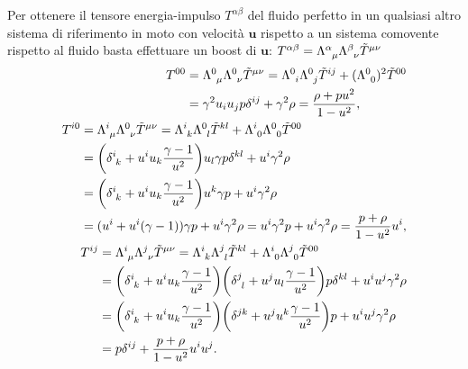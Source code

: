 Per ottenere il tensore energia-impulso $T^{\alpha\beta}$ del fluido perfetto in
un qualsiasi altro sistema di riferimento in moto con velocità $\bm{u}$ rispetto
a un sistema comovente rispetto al fluido basta effettuare un boost di
$\bm{u}$:
$T^{\alpha\beta} =
\tensor{\Lambda}{^{\alpha}_{\mu}}\tensor{\Lambda}{^{\beta}_{\nu}}\tilde
T^{\mu\nu}$
\begin{subequations}
  \begin{align}
    \begin{split}
      T^{00} &= \tensor{\Lambda}{^{0}_{\mu}} \tensor{\Lambda}{^{0}_{\nu}} \tilde
      T^{\mu\nu} = \tensor{\Lambda}{^{0}_{i}} \tensor{\Lambda}{^{0}_{j}} \tilde
      T^{ij} + (\tensor{\Lambda}{^{0}_{0}})^{2} \tilde T^{00} \\
      &= \gamma^{2} u_{i} u_{j} p \delta^{ij} + \gamma^{2} \rho = \frac{\rho +
        pu^{2}}{1-u^{2}},
    \end{split} \\
    \begin{split}
      T^{i0} &= \tensor{\Lambda}{^{i}_{\mu}} \tensor{\Lambda}{^{0}_{\nu}} \tilde
      T^{\mu\nu} = \tensor{\Lambda}{^{i}_{k}} \tensor{\Lambda}{^{0}_{l}} \tilde
      T^{kl} + \tensor{\Lambda}{^{i}_{0}} \tensor{\Lambda}{^{0}_{0}} \tilde
      T^{00} \\
      &= \bigg(\tensor{\delta}{^{i}_{k}} + u^{i}u_{k}\frac{\gamma -
        1}{u^{2}}\bigg) u_{l} \gamma p \delta^{kl} + u^{i} \gamma^{2} \rho \\
      &= \bigg(\tensor{\delta}{^{i}_{k}} + u^{i}u_{k}\frac{\gamma - 1}{u^{2}}\bigg)
      u^{k} \gamma p + u^{i} \gamma^{2} \rho \\
      &= (u^{i} + u^{i}(\gamma - 1)) \gamma p + u^{i} \gamma^{2} \rho =
      u^{i}\gamma^{2} p + u^{i} \gamma^{2} \rho = \frac{p + \rho}{1 -
        u^{2}}u^{i},
    \end{split} \\
    \begin{split}
      T^{ij} &= \tensor{\Lambda}{^{i}_{\mu}} \tensor{\Lambda}{^{j}_{\nu}} \tilde
      T^{\mu\nu} = \tensor{\Lambda}{^{i}_{k}} \tensor{\Lambda}{^{j}_{l}} \tilde
      T^{kl} + \tensor{\Lambda}{^{i}_{0}} \tensor{\Lambda}{^{j}_{0}} \tilde
      T^{00} \\
      &= \bigg(\tensor{\delta}{^{i}_{k}} + u^{i}u_{k}\frac{\gamma -
        1}{u^{2}}\bigg) \bigg(\tensor{\delta}{^{j}_{l}} + u^{j}u_{l}\frac{\gamma
        - 1}{u^{2}}\bigg) p \delta^{kl} + u^{i}u^{j} \gamma^{2} \rho \\
      &= \bigg(\tensor{\delta}{^{i}_{k}} + u^{i}u_{k}\frac{\gamma -
        1}{u^{2}}\bigg) \bigg(\delta^{jk} + u^{j}u^{k}\frac{\gamma -
        1}{u^{2}}\bigg) p + u^{i}u^{j} \gamma^{2} \rho \\
      &= p \delta^{ij} + \frac{p + \rho}{1 - u^{2}}u^{i}u^{j}.
    \end{split}
  \end{align}
\end{subequations}

